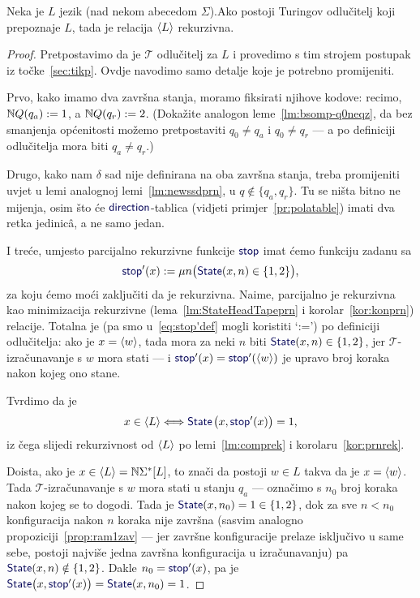 \begin{teorem}[{name=[rekurzivnost Turing-odlučivog jezika]}]\label{tm:oikr}
    Neka je $L$ jezik (nad nekom abecedom $\Sigma$).\newline Ako postoji Turingov odlučitelj koji prepoznaje $L$, tada je relacija $\langle L\rangle$ rekurzivna.
\end{teorem}
\begin{proof}
Pretpostavimo da je $\mathcal T$ odlučitelj za $L$ i provedimo s tim strojem postupak iz točke~\ref{sec:tikp}. Ovdje navodimo samo detalje koje je potrebno promijeniti.

Prvo, kako imamo dva završna stanja, moramo fiksirati njihove kodove: recimo, ${\mathbb N} Q(q_a):=1$, a ${\mathbb N} Q(q_r):=2$. (Dokažite analogon leme~\ref{lm:bsomp-q0neqz}, da bez smanjenja općenitosti možemo pretpostaviti $q_0\ne q_a$ i $q_0\ne q_r$ --- a po definiciji odlučitelja mora biti $q_a\ne q_r$.)

    Drugo, kako nam $\delta$ sad nije definirana na oba završna stanja, treba promijeniti uvjet u lemi analognoj lemi~\ref{lm:newssdprn}, u $q\notin\{q_a,q_r\}$. Tu se ništa bitno ne mijenja, osim što će $\f{direction}$-tablica (vidjeti primjer~\ref{pr:polatable}) imati dva retka jedinicâ, a ne samo jedan.

I treće, umjesto parcijalno rekurzivne funkcije $\f{stop}$ imat ćemo funkciju zadanu sa
\begin{equation}\label{eq:stop'def}
    \f{stop}'(x):=\mu n\bigl(\f{State}(x,n)\in\{1,2\}\bigr)\text,
\end{equation}
	za koju ćemo moći zaključiti da je rekurzivna. Naime, parcijalno je rekurzivna kao minimizacija rekurzivne (lema~\ref{lm:StateHeadTapeprn} i korolar~\ref{kor:konprn}) relacije. Totalna je (pa smo u~\eqref{eq:stop'def} mogli koristiti \enquote*{:=}) po definiciji odlučitelja: ako je $x=\langle w\rangle$, tada mora za neki $n$ biti $\f{State}(x,n)\in\{1,2\}$, jer $\mathcal T$-izračunavanje s $w$ mora stati --- i $\f{stop}'(x)=\f{stop}'(\kr w)$ je upravo broj koraka nakon kojeg ono stane.

Tvrdimo da je
\begin{equation}
	x\in\kr L\Longleftrightarrow\f{State}\mspace{2mu}\bigl(x,\f{stop}'(x)\bigr)=1\text,
\end{equation}
iz čega slijedi rekurzivnost od $\langle L\rangle$ po lemi~\ref{lm:comprek} i korolaru~\ref{kor:prnrek}.

Doista, ako je $x\in\langle L\rangle={\mathbb N}\Sigma^*[L]$, to znači da postoji $w\in L$ takva da je $x=\langle w\rangle$. Tada $\mathcal T$-izračunavanje s $w$ mora stati u stanju $q_a$ --- označimo s $n_0$ broj koraka nakon kojeg se to dogodi. Tada je $\f{State}(x,n_0)=1\in\{1,2\}$, dok za sve $n<n_0$ konfiguracija nakon $n$ koraka nije završna (sasvim analogno propoziciji~\ref{prop:ram1zav} --- jer završne konfiguracije prelaze isključivo u same sebe, postoji najviše jedna završna konfiguracija u izračunavanju) pa $\f{State}(x,n)\notin\{1,2\}$. Dakle $n_0=\f{stop}'(x)$, pa je $\f{State}\bigl(x,\f{stop}'(x)\bigr)=\f{State}(x,n_0)=1$.


\end{proof}
